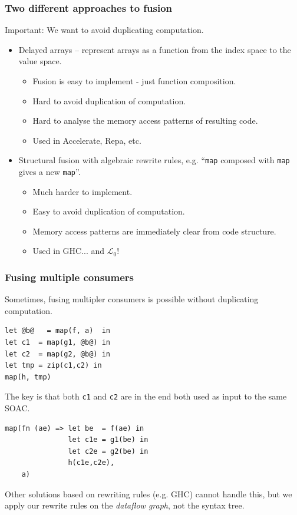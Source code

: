 \documentclass{beamer}
\newcommand{\LO}{$\mathcal{L}_0$}
\begin{document}
\begin{frame}
  \frametitle{Two different approaches to fusion}

  Important: We want to avoid duplicating computation.

  \begin{itemize}
  \item Delayed arrays -- represent arrays as a function from the index
    space to the value space.
    \begin{itemize}
    \item Fusion is easy to implement - just function composition.
    \item Hard to avoid duplication of computation.
    \item Hard to analyse the memory access patterns of resulting code.
    \item Used in Accelerate, Repa, etc.
    \end{itemize}
    \pause
  \item Structural fusion with algebraic rewrite rules,
    e.g. ``\texttt{map} composed with \texttt{map} gives a new
    \texttt{map}''.
    \begin{itemize}
    \item Much harder to implement.
    \item Easy to avoid duplication of computation.
    \item Memory access patterns are immediately clear from code
      structure.
    \item Used in GHC... and \LO{}!
    \end{itemize}
  \end{itemize}
\end{frame}

\begin{frame}[fragile]
  \frametitle{Fusing multiple consumers}

  Sometimes, fusing multipler consumers is possible without
  duplicating computation.

\begin{lstlisting}
let @b@   = map(f, a)  in
let c1  = map(g1, @b@) in
let c2  = map(g2, @b@) in
let tmp = zip(c1,c2) in
map(h, tmp)
\end{lstlisting}

  The key is that both \texttt{c1} and \texttt{c2} are in the end both
  used as input to the same SOAC.

\begin{lstlisting}
map(fn (ae) => let be  = f(ae) in
               let c1e = g1(be) in
               let c2e = g2(be) in
               h(c1e,c2e),
    a)
\end{lstlisting}

  Other solutions based on rewriting rules (e.g. GHC) cannot handle
  this, but we apply our rewrite rules on the \textit{dataflow graph},
  not the syntax tree.
\end{frame}
\end{document}
